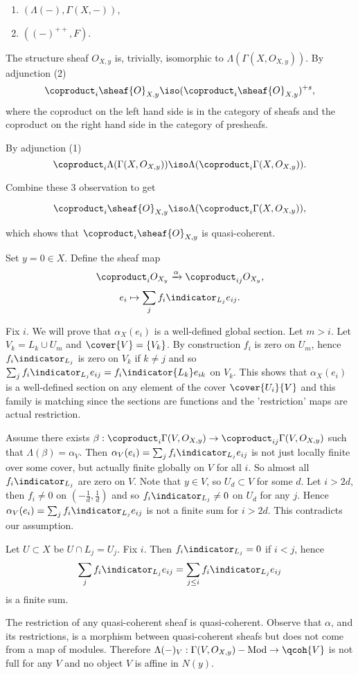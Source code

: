 \begin{enumerate}
\item $(\Lambda(-),\Gamma(X,-))$,
\item $((-)^{++},F)$.
\end{enumerate}

The structure sheaf $O_{X,y}$ is, trivially, isomorphic to $\Lambda(\Gamma(X,O_{X,y}))$.
By adjunction (2)
\[\coproduct_i \sheaf{O}_{X,y} \iso (\coproduct_i \sheaf{O}_{X,y})^{+s},\]
where the coproduct on the left hand side is in the category of sheafs and the coproduct on the right hand side in the category of presheafs.

By adjunction (1)
\[\coproduct_i \Lambda(\Gamma(X,O_{X,y})) \iso \Lambda(\coproduct_i \Gamma(X,O_{X,y})).\]

Combine these 3 observation to get

\[\coproduct_i \sheaf{O}_{X,y} \iso \Lambda(\coproduct_i \Gamma(X,O_{X,y})),\]

which shows that $\coproduct_i \sheaf{O}_{X,y}$ is quasi-coherent.


Set $y=0\in X$.
Define the sheaf map 
\[\coproduct_i O_{X_y} \xrightarrow{\alpha} \coproduct_{ij} O_{X_y},\]
\[e_i \mapsto \sum_{j} f_i \indicator_{L_j} e_{ij}.\]

Fix $i$. We will prove that $\alpha_X(e_i)$ is a well-defined global section.
Let $m>i$. Let $V_k=L_k\cup U_m$ and $\cover{V}=\{V_k\}$.
By construction $f_i$ is zero on $U_m$, hence $f_i \indicator_{L_j}$ is zero on $V_k$ if $k\neq j$ and so $\sum_{j} f_i \indicator_{L_j} e_{ij} = f_i\indicator{L_k}e_{ik}$ on $V_k$.
This shows that $\alpha_X(e_i)$ is a well-defined section on any element of the cover $\cover{U_i}{V}$ and
this family is matching since the sections are functions and the 'restriction' maps are actual restriction.

Assume there exists $\beta: \coproduct_i \Gamma(V,O_{X,y}) \rightarrow \coproduct_{ij} \Gamma(V,O_{X,y})$ such that $\Lambda(\beta)=\alpha_V$.
Then $\alpha_V(e_i)=\sum_{j} f_i \indicator_{L_j} e_{ij}$ is not just locally finite over some cover, but actually finite globally on $V$ for all $i$.
So almost all $f_i \indicator_{L_j}$ are zero on $V$. 
Note that $y\in V$, so $U_d\subset V$ for some $d$. 
Let $i>2d$, then $f_i\neq 0$ on $(-\frac{1}{d},\frac{1}{d})$ and so $f_i \indicator_{L_j}\neq 0$ on $U_d$ for any $j$.
Hence $\alpha_V(e_i)=\sum_{j} f_i \indicator_{L_j} e_{ij}$ is not a finite sum for $i>2d$. 
This contradicts our assumption.

Let $U\subset X$ be $U\cap L_j = U_{j}$. Fix $i$.
Then $f_i\indicator_{L_j}=0$ if $i<j$, hence \[\sum_{j} f_i \indicator_{L_j} e_{ij}=\sum_{j\leq i} f_i \indicator_{L_j} e_{ij}\] is a finite sum.

The restriction of any quasi-coherent sheaf is quasi-coherent. 
Observe that $\alpha$, and its restrictions, is a morphism between quasi-coherent sheafs but does not come from a map of modules.
Therefore $\Lambda(-)_V: \Gamma(V, O_{X,y})-\mbox{Mod} \rightarrow \qcoh{V}$ is not full for any $V$ and no object $V$ is affine in $N(y)$.
